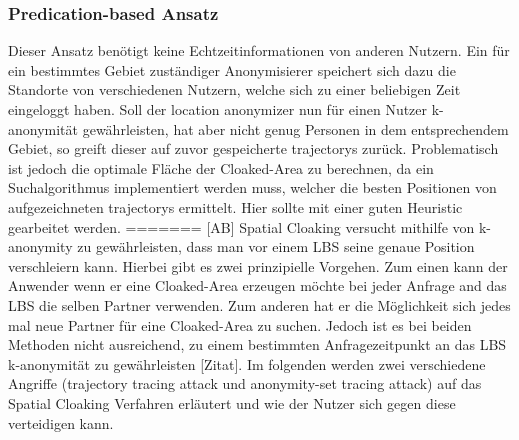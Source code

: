 \subsubsection{Predication-based Ansatz} 
Dieser Ansatz benötigt keine Echtzeitinformationen von anderen Nutzern. Ein für ein bestimmtes Gebiet zuständiger Anonymisierer speichert sich dazu die Standorte von verschiedenen Nutzern, welche sich zu einer beliebigen Zeit eingeloggt haben. Soll der location anonymizer nun für einen Nutzer k-anonymität gewährleisten, hat aber nicht genug Personen in dem entsprechendem Gebiet, so greift dieser auf zuvor gespeicherte trajectorys zurück. Problematisch ist jedoch die optimale Fläche der Cloaked-Area zu berechnen, da ein Suchalgorithmus implementiert werden muss, welcher die besten Positionen von aufgezeichneten trajectorys ermittelt. Hier sollte mit einer guten Heuristic gearbeitet werden. 
=======
[AB] Spatial Cloaking versucht mithilfe von k-anonymity \cite{Gedik2008} zu gewährleisten, dass man vor einem LBS seine genaue Position verschleiern kann. Hierbei gibt es zwei prinzipielle Vorgehen. Zum einen kann der Anwender wenn er eine Cloaked-Area erzeugen möchte bei jeder Anfrage and das LBS die selben Partner verwenden. Zum anderen hat er die Möglichkeit sich jedes mal neue Partner für eine Cloaked-Area zu suchen. Jedoch ist es bei beiden Methoden nicht ausreichend, zu einem bestimmten Anfragezeitpunkt an das LBS k-anonymität zu gewährleisten [Zitat]. Im folgenden werden zwei verschiedene Angriffe (trajectory tracing attack und anonymity-set tracing attack) auf das Spatial Cloaking Verfahren erläutert und wie der Nutzer sich gegen diese verteidigen kann. 
